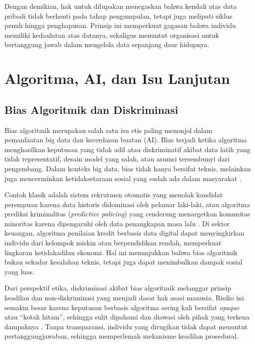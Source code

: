 Dengan demikian, hak untuk dilupakan menegaskan bahwa kendali atas data pribadi tidak berhenti pada tahap pengumpulan, tetapi juga meliputi siklus penuh hingga penghapusan. Prinsip ini memperkuat gagasan bahwa individu memiliki kedaulatan atas datanya, sekaligus menuntut organisasi untuk bertanggung jawab dalam mengelola data sepanjang daur hidupnya.


\section{Algoritma, AI, dan Isu Lanjutan}

\subsection{Bias Algoritmik dan Diskriminasi}

Bias algoritmik merupakan salah satu isu etis paling menonjol dalam pemanfaatan big data dan kecerdasan buatan (AI). Bias terjadi ketika algoritma menghasilkan keputusan yang tidak adil atau diskriminatif akibat data latih yang tidak representatif, desain model yang salah, atau asumsi tersembunyi dari pengembang. Dalam konteks big data, bias tidak hanya bersifat teknis, melainkan juga mencerminkan ketidaksetaraan sosial yang sudah ada dalam masyarakat \cite{barocas2016big}.  

Contoh klasik adalah sistem rekrutmen otomatis yang menolak kandidat perempuan karena data historis didominasi oleh pelamar laki-laki, atau algoritma prediksi kriminalitas (\textit{predictive policing}) yang cenderung menargetkan komunitas minoritas karena dipengaruhi oleh data penangkapan masa lalu \cite{angwin2016machine}. Di sektor keuangan, algoritma penilaian kredit berbasis data digital dapat menyingkirkan individu dari kelompok miskin atau berpendidikan rendah, memperkuat lingkaran ketidakadilan ekonomi. Hal ini menunjukkan bahwa bias algoritmik bukan sekadar kesalahan teknis, tetapi juga dapat menimbulkan dampak sosial yang luas.  

Dari perspektif etika, diskriminasi akibat bias algoritmik melanggar prinsip keadilan dan non-diskriminasi yang menjadi dasar hak asasi manusia. Risiko ini semakin besar karena keputusan berbasis algoritma sering kali bersifat \textit{opaque} atau “kotak hitam”, sehingga sulit dipahami dan diawasi oleh pihak yang terkena dampaknya \cite{mittelstadt2016ethics}. Tanpa transparansi, individu yang dirugikan tidak dapat menuntut pertanggungjawaban, sehingga memperlemah mekanisme keadilan prosedural.  

